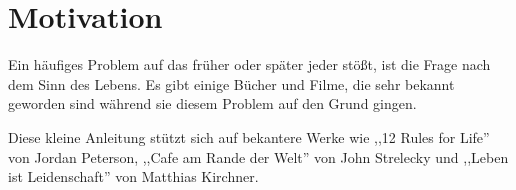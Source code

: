 \documentclass[../Lebensziel.tex]{subfiles}
\begin{document}
\chapter{Motivation}\thispagestyle{fancy}

Ein häufiges Problem auf das früher oder später jeder stößt, ist die Frage nach dem Sinn des Lebens. Es gibt einige Bücher und Filme, die sehr bekannt geworden sind während sie diesem Problem auf den Grund gingen.

Diese kleine Anleitung stützt sich auf bekantere Werke wie ,,12 Rules for Life''\cite{rules-for-life} von Jordan Peterson, ,,Cafe am Rande der Welt''\cite{cafe-rande-welt} von John Strelecky und ,,Leben ist Leidenschaft''\cite{leben-leidenschaft} von Matthias Kirchner.
\end{document}

